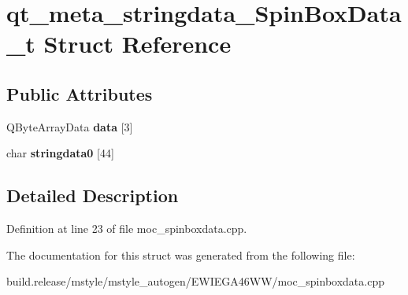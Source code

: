 \hypertarget{structqt__meta__stringdata___spin_box_data__t}{}\section{qt\+\_\+meta\+\_\+stringdata\+\_\+\+Spin\+Box\+Data\+\_\+t Struct Reference}
\label{structqt__meta__stringdata___spin_box_data__t}
\subsection*{Public Attributes}
\begin{DoxyCompactItemize}
\item 
\mbox{\label{structqt__meta__stringdata___spin_box_data__t_ac7434ae57f295b99f864ed12a9481bda}} 
Q\+Byte\+Array\+Data {\bfseries data} \mbox{[}3\mbox{]}
\item 
\mbox{\label{structqt__meta__stringdata___spin_box_data__t_a447ac179773770036c414d26bcceed77}} 
char {\bfseries stringdata0} \mbox{[}44\mbox{]}
\end{DoxyCompactItemize}


\subsection{Detailed Description}


Definition at line 23 of file moc\+\_\+spinboxdata.\+cpp.



The documentation for this struct was generated from the following file\+:\begin{DoxyCompactItemize}
\item 
build.\+release/mstyle/mstyle\+\_\+autogen/\+E\+W\+I\+E\+G\+A46\+W\+W/moc\+\_\+spinboxdata.\+cpp\end{DoxyCompactItemize}
